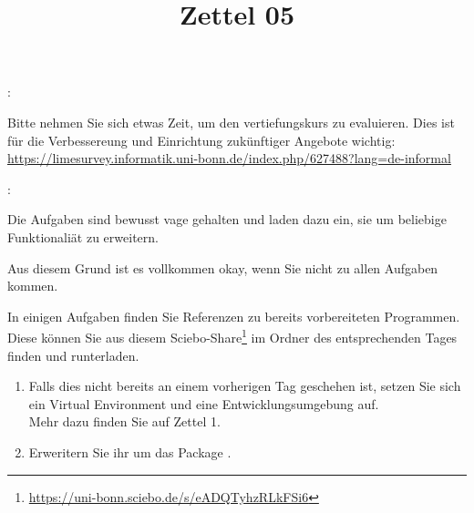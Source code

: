 \documentclass{ubo_tex_uebungszettel/uebungszettel}
\title{Zettel 05}
\theoremstyle{definition}
\newcommand{\pp}[1]{\lpl{#1}}
\newcommand{\furl}[1]{\footnote{\url{#1}}}
\begin{document}
	\maketitle


    \noindent {}: \quad
	
	\noindent Bitte nehmen Sie sich etwas Zeit, um den vertiefungskurs zu evaluieren. Dies ist für die Verbessereung und Einrichtung zukünftiger Angebote wichtig:\\
    \underline{https://limesurvey.informatik.uni-bonn.de/index.php/627488?lang=de-informal}

	\medskip
    \medskip
	
	\noindent {}: \quad
	
	\noindent Die Aufgaben sind bewusst vage gehalten und laden dazu ein, sie um beliebige Funktionaliät zu erweitern.
	
	\noindent Aus diesem Grund ist es vollkommen okay, wenn Sie nicht zu allen Aufgaben kommen.
	
	\noindent In einigen Aufgaben finden Sie Referenzen zu bereits vorbereiteten Programmen. Diese können Sie aus diesem Sciebo-Share\furl{https://uni-bonn.sciebo.de/s/eADQTyhzRLkFSi6} im Ordner des entsprechenden Tages finden und runterladen.
	
	\medskip
	
	
	\noindent {} \quad
	
    \begin{enumerate}
	\item Falls dies nicht bereits an einem vorherigen Tag geschehen ist, setzen Sie sich ein Virtual Environment und eine Entwicklungsumgebung auf.\\
	Mehr dazu finden Sie auf Zettel 1.
	
	\item Erweritern Sie ihr \pp{venv} um das Package \pp{discord.py}.
\end{enumerate}
	
	\medskip
	
\end{document}
